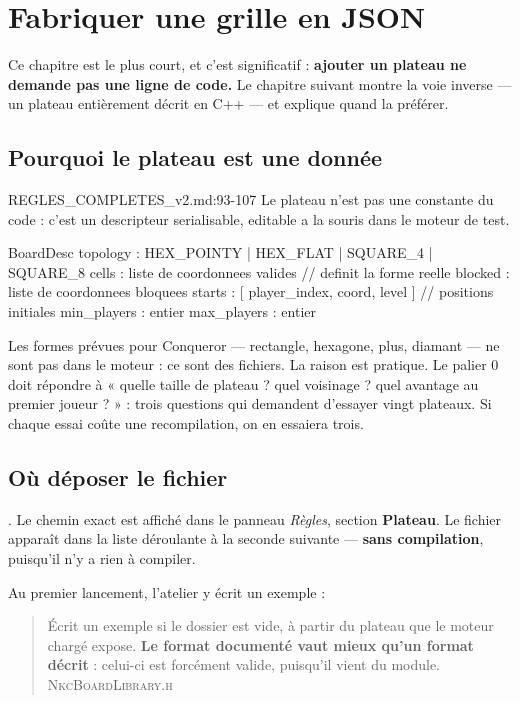 \chapter{Fabriquer une grille en JSON}

Ce chapitre est le plus court, et c'est significatif : \textbf{ajouter un plateau
ne demande pas une ligne de code.} Le chapitre suivant montre la voie inverse —
un plateau entièrement décrit en C++ — et explique quand la préférer.

\section{Pourquoi le plateau est une donnée}

\begin{nkcode}{REGLES\_COMPLETES\_v2.md:93-107}
Le plateau n'est pas une constante du code : c'est un descripteur serialisable,
editable a la souris dans le moteur de test.

BoardDesc {
  topology     : HEX_POINTY | HEX_FLAT | SQUARE_4 | SQUARE_8
  cells        : liste de coordonnees valides        // definit la forme reelle
  blocked      : liste de coordonnees bloquees
  starts       : [ { player_index, coord, level } ]  // positions initiales
  min_players  : entier
  max_players  : entier
}
\end{nkcode}

Les formes prévues pour Conqueror — rectangle, hexagone, plus, diamant — ne sont
pas dans le moteur : ce sont des fichiers. La raison est pratique. Le palier 0
doit répondre à « quelle taille de plateau ? quel voisinage ? quel avantage au
premier joueur ? » : trois questions qui demandent d'essayer vingt plateaux. Si
chaque essai coûte une recompilation, on en essaiera trois.

\section{Où déposer le fichier}

. Le chemin exact est affiché
dans le panneau \emph{Règles}, section \textbf{Plateau}. Le fichier apparaît dans
la liste déroulante à la seconde suivante — \textbf{sans compilation}, puisqu'il
n'y a rien à compiler.

Au premier lancement, l'atelier y écrit un exemple :

\begin{quote}\small
Écrit un exemple si le dossier est vide, à partir du plateau que le moteur chargé
expose. \textbf{Le format documenté vaut mieux qu'un format décrit} : celui-ci est
forcément valide, puisqu'il vient du module.
\hfill\textsc{NkcBoardLibrary.h}
\end{quote}

